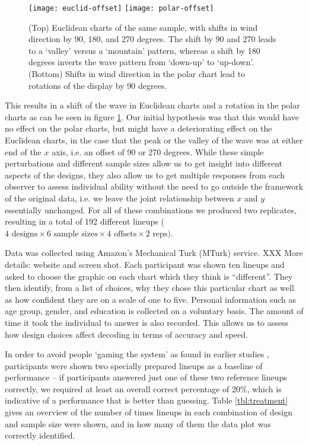 \begin{figure}[htbp] %
   \centering
   \texttt{[image: euclid-offset]} 
   \texttt{[image: polar-offset]} 
   \caption{ \label{fig:offset} (Top) Euclidean charts of the same sample, with shifts in wind direction by 90, 180, and 270 degrees. The shift by 90 and 270 leads to a `valley' versus a `mountain' pattern, whereas a shift by 180 degrees inverts the wave pattern from `down-up' to `up-down'.\hfill\newline
      (Bottom) Shifts in wind direction in the polar chart lead to rotations of the display by 90 degrees.}
\end{figure}

 This results in a shift of the wave in Euclidean charts and a rotation in the polar charts as can be seen in figure \ref{fig:offset}. Our initial hypothesis was that this would have no effect on the polar charts, but might have a deteriorating effect on the Euclidean charts, in the case that the peak or the valley of the wave was at either end of the $x$ axis, i.e. an offset of 90 or 270 degrees. 
While these simple perturbations and different sample sizes allow us to get insight into different aspects of the designs, they also allow us to get multiple responses from each observer to assess individual ability without the need to go outside the framework of the original data, i.e. we leave the joint relationship between $x$ and $y$ essentially unchanged. For all of these combinations we produced two replicates, resulting in a total of 192 different lineups ($ 4 \text{ designs} \times 6 \text{ sample sizes} \times 4 \text{ offsets} \times 2 \text{ reps})$.

Data was collected using Amazon's Mechanical Turk (MTurk) service. XXX More details: website and screen shot.
 Each participant was shown ten lineups and asked to choose the graphic on each chart which they think is ``different''. They then identify, from a list of choices, why they chose this particular chart as well as how confident they are on a scale of one to five. Personal information such as age group, gender, and education is collected on a voluntary basis. 
The amount of time it took the individual to answer is also recorded. This  allows us to assess how design choices affect decoding \citet{cleveland:1994} in terms of accuracy and speed.
 
 In order to avoid people `gaming the system' as found in earlier studies \cite{heer:2010, kosara:2010}, participants were shown two specially prepared lineups as a baseline of performance -- if participants answered just one of these two reference lineups correctly, we required at least an overall correct percentage of 20\%, which is indicative of a performance that is better than guessing. Table \ref{tbl:treatment} gives an overview of the number of times lineups in each combination of design and sample size were shown, and in how many of them the data plot was correctly identified. 

